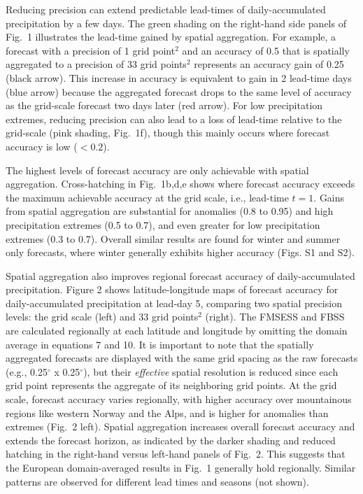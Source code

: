 \documentclass[preprint,12pt,authoryear]{elsarticle}
\begin{document}
Reducing precision can extend predictable lead-times of daily-accumulated precipitation by a few days. The green shading on the right-hand side panels of Fig.~1 illustrates the lead-time gained by spatial aggregation. For example, a forecast with a precision of 1 grid point$^2$ and an accuracy of 0.5 that is spatially aggregated to a precision of 33 grid points$^2$ represents an accuracy gain of 0.25 (black arrow). This increase in accuracy is equivalent to gain in 2 lead-time days (blue arrow) because the aggregated forecast drops to the same level of accuracy as the grid-scale forecast two days later (red arrow). For low precipitation extremes, reducing precision can also lead to a loss of lead-time relative to the grid-scale (pink shading, Fig.~1f), though this mainly occurs where forecast accuracy is low ($< 0.2$). 


The highest levels of forecast accuracy are only achievable with spatial aggregation. Cross-hatching in Fig.~1b,d,e shows where forecast accuracy exceeds the maximum achievable accuracy at the grid scale, i.e., lead-time $t=1$. Gains from spatial aggregation are substantial for anomalies (0.8 to 0.95) and high precipitation extremes (0.5 to 0.7), and even greater for low precipitation extremes (0.3 to 0.7). Overall similar results are found for winter and summer only forecasts, where winter generally exhibits higher accuracy (Figs. S1 and S2).


Spatial aggregation also improves regional forecast accuracy of daily-accumulated precipitation. Figure 2 shows latitude-longitude maps of forecast accuracy for daily-accumulated precipitation at lead-day 5, comparing two spatial precision levels: the grid scale (left) and 33 grid points$^{2}$ (right). The FMSESS and FBSS are calculated regionally at each latitude and longitude by omitting the domain average in equations 7 and 10. It is important to note that the spatially aggregated forecasts are displayed with the same grid spacing as the raw forecasts (e.g., 0.25$^{\circ}$ x 0.25$^{\circ}$), but their {\it effective} spatial resolution is reduced since each grid point represents the aggregate of its neighboring grid points. At the grid scale, forecast accuracy varies regionally, with higher accuracy over mountainous regions like western Norway and the Alps, and is higher for anomalies than extremes (Fig.~2 left). Spatial aggregation increases overall forecast accuracy and extends the forecast horizon, as indicated by the darker shading and reduced hatching in the right-hand versus left-hand panels of Fig.~2. This suggests that the European domain-averaged results in Fig.~1 generally hold regionally. Similar patterns are observed for different lead times and seasons (not shown). 
\end{document}
